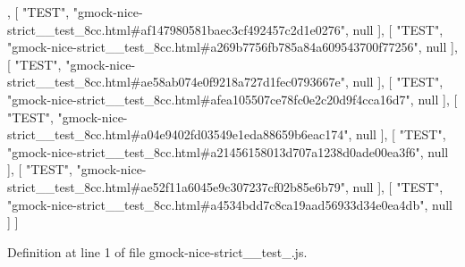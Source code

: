 \begin{DoxyCode}
    ,
    [ \textcolor{stringliteral}{"TEST"}, \textcolor{stringliteral}{"gmock-nice-strict\_\_test\_8cc.html#af147980581baec3cf492457c2d1e0276"}, null ],
    [ \textcolor{stringliteral}{"TEST"}, \textcolor{stringliteral}{"gmock-nice-strict\_\_test\_8cc.html#a269b7756fb785a84a609543700f77256"}, null ],
    [ \textcolor{stringliteral}{"TEST"}, \textcolor{stringliteral}{"gmock-nice-strict\_\_test\_8cc.html#ae58ab074e0f9218a727d1fec0793667e"}, null ],
    [ \textcolor{stringliteral}{"TEST"}, \textcolor{stringliteral}{"gmock-nice-strict\_\_test\_8cc.html#afea105507ce78fc0e2c20d9f4cca16d7"}, null ],
    [ \textcolor{stringliteral}{"TEST"}, \textcolor{stringliteral}{"gmock-nice-strict\_\_test\_8cc.html#a04e9402fd03549e1eda88659b6eac174"}, null ],
    [ \textcolor{stringliteral}{"TEST"}, \textcolor{stringliteral}{"gmock-nice-strict\_\_test\_8cc.html#a21456158013d707a1238d0ade00ea3f6"}, null ],
    [ \textcolor{stringliteral}{"TEST"}, \textcolor{stringliteral}{"gmock-nice-strict\_\_test\_8cc.html#ae52f11a6045e9c307237cf02b85e6b79"}, null ],
    [ \textcolor{stringliteral}{"TEST"}, \textcolor{stringliteral}{"gmock-nice-strict\_\_test\_8cc.html#a4534bdd7c8ca19aad56933d34e0ea4db"}, null ]
]
\end{DoxyCode}


Definition at line 1 of file gmock-\/nice-\/strict\+\_\+\+\_\+test\+\_.\+js.


